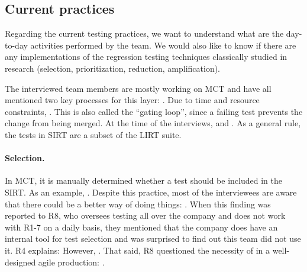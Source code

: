 \subsection{Current practices}

Regarding the current testing practices, we want to understand what are the day-to-day activities performed by the team.
We would also like to know if there are any implementations of the regression testing techniques classically studied in research (selection, prioritization, reduction, amplification).

The interviewed team members are mostly working on MCT and have all mentioned two key processes for this layer: . 
Due to time and resource constraints, .
This is also called the ``gating loop'', since a failing test prevents the change from being merged.
At the time of the interviews,  and .
As a general rule, the tests in SIRT are a subset of the LIRT suite.

\paragraph{Selection.} In MCT, it is manually determined whether a test should be included in the SIRT. As an example, .
Despite this practice, most of the interviewees are aware that there could be a better way of doing things: .
When this finding was reported to R8, who oversees testing all over the company and does not work with R1-7 on a daily basis, they mentioned that the company does have an internal tool for test selection and was surprised to find out this team did not use it.
R4 explains:  
However, .
That said, R8 questioned the necessity of \tcs in a well-designed agile production: .

